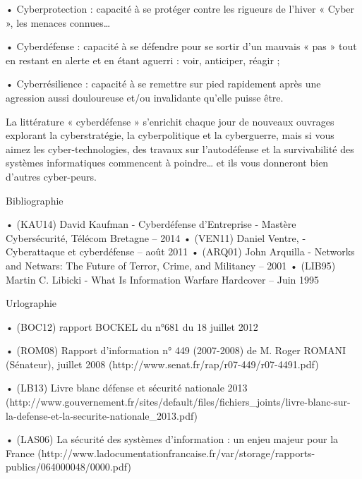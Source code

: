 •  Cyberprotection : capacité à se protéger contre les rigueurs de l’hiver « Cyber », les menaces connues…

•  Cyberdéfense : capacité à se défendre pour se sortir d’un mauvais « pas » tout en restant en alerte et en étant aguerri : voir, anticiper, réagir ;

•  Cyberrésilience : capacité à se remettre sur pied rapidement après une agression aussi douloureuse et/ou invalidante qu’elle puisse être.

La littérature « cyberdéfense » s’enrichit chaque jour de nouveaux ouvrages explorant la cyberstratégie, la cyberpolitique et la cyberguerre, mais si vous aimez les cyber-technologies, des travaux sur l’autodéfense et la survivabilité des systèmes informatiques commencent à poindre… et ils vous donneront bien d’autres cyber-peurs. 



Bibliographie
 
• (KAU14) David Kaufman - Cyberdéfense d’Entreprise - Mastère Cybersécurité, Télécom Bretagne – 2014
• (VEN11) Daniel Ventre, - Cyberattaque et cyberdéfense – août 2011
• (ARQ01) John Arquilla - Networks and Netwars: The Future of Terror, Crime, and Militancy – 2001
• (LIB95) Martin C. Libicki - What Is Information Warfare Hardcover – Juin 1995
 
Urlographie
 
• (BOC12) rapport BOCKEL du n°681 du 18 juillet 2012
 
•  (ROM08) Rapport d’information n° 449 (2007-2008) de M. Roger ROMANI (Sénateur), juillet 2008 (http://www.senat.fr/rap/r07-449/r07-4491.pdf)
 
• (LB13) Livre blanc défense et sécurité nationale 2013 (http://www.gouvernement.fr/sites/default/files/fichiers_joints/livre-blanc-sur-la-defense-et-la-securite-nationale_2013.pdf)
 
• (LAS06) La sécurité des systèmes d’information : un enjeu majeur pour la France (http://www.ladocumentationfrancaise.fr/var/storage/rapports-publics/064000048/0000.pdf)
